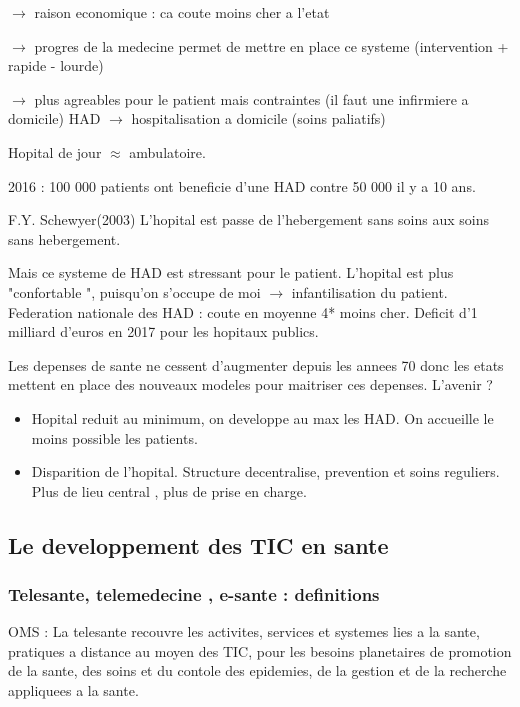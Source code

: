 \documentclass{article}
\begin{document}
	$\rightarrow $ raison economique : ca coute moins cher a l'etat

	$\rightarrow $ progres de la medecine permet de mettre en place ce systeme (intervention + rapide - lourde)

	$\rightarrow $ plus agreables pour le patient mais contraintes (il faut une infirmiere a domicile)
	\newline\newline
	HAD $\rightarrow$ hospitalisation a domicile (soins paliatifs)
	
	Hopital de jour $\approx $ ambulatoire.

2016 : 100 000 patients ont beneficie d'une HAD contre 50 000 il y a 10 ans.

F.Y. Schewyer(2003) L'hopital est passe de l'hebergement sans soins aux soins sans hebergement.

Mais ce systeme de HAD est stressant pour le patient. L'hopital est plus "confortable ", puisqu'on s'occupe de moi $\rightarrow$ infantilisation du patient.
Federation nationale des HAD : coute en moyenne 4* moins cher.
Deficit d'1 milliard d'euros en 2017 pour les hopitaux publics.

Les depenses de sante ne cessent d'augmenter depuis les annees 70 donc les etats mettent en place des nouveaux modeles pour maitriser ces depenses.
\newline\newline
L'avenir ?
\begin{itemize}[label=\textbullet]
	\item Hopital reduit au minimum, on developpe au max les HAD. On accueille le moins possible les patients.
	\item Disparition de l'hopital. Structure decentralise, prevention et soins reguliers. Plus de lieu central , plus de prise en charge.
\end{itemize}

\subsection{Le developpement des TIC en sante}
\subsubsection{Telesante, telemedecine , e-sante : definitions}

OMS : La telesante recouvre les activites, services et systemes lies a la sante, pratiques a distance au moyen des TIC, pour les besoins planetaires de promotion de la sante, des soins et du contole des epidemies, de la gestion et de la recherche appliquees a la sante.
\end{document}
